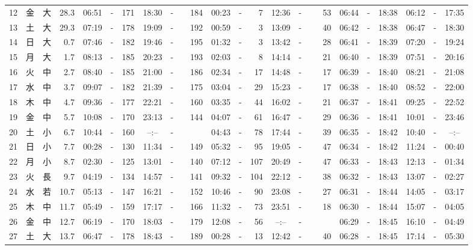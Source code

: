 \documentclass[12pt,a4j]{jsarticle}
\begin{document}
\begin{table}[htbp]
\begin{center}
{\begin{tabular}{|rc|cr|ccrccr|ccrccr|ccc|ccc|}
12 & 金 & 大 & 28.3 &  06:51 &-& 171 &  18:30 &-& 184 &  00:23 &-&   7 &  12:36 &-&  53 & 06:44 & -& 18:38 & 06:12 & -& 17:35 \\
13 & 土 & 大 & 29.3 &  07:19 &-& 178 &  19:09 &-& 192 &  00:59 &-&   3 &  13:09 &-&  40 & 06:42 & -& 18:38 & 06:47 & -& 18:30 \\
14 & 日 & 大 &  0.7 &  07:46 &-& 182 &  19:46 &-& 195 &  01:32 &-&   3 &  13:42 &-&  28 & 06:41 & -& 18:39 & 07:20 & -& 19:24 \\
15 & 月 & 大 &  1.7 &  08:13 &-& 185 &  20:23 &-& 193 &  02:03 &-&   8 &  14:14 &-&  21 & 06:40 & -& 18:39 & 07:51 & -& 20:16 \\
16 & 火 & 中 &  2.7 &  08:40 &-& 185 &  21:00 &-& 186 &  02:34 &-&  17 &  14:48 &-&  17 & 06:39 & -& 18:40 & 08:21 & -& 21:08 \\
17 & 水 & 中 &  3.7 &  09:07 &-& 182 &  21:39 &-& 175 &  03:04 &-&  29 &  15:23 &-&  17 & 06:38 & -& 18:40 & 08:52 & -& 22:00 \\
18 & 木 & 中 &  4.7 &  09:36 &-& 177 &  22:21 &-& 160 &  03:35 &-&  44 &  16:02 &-&  21 & 06:37 & -& 18:41 & 09:25 & -& 22:52 \\
19 & 金 & 中 &  5.7 &  10:08 &-& 170 &  23:13 &-& 144 &  04:07 &-&  61 &  16:47 &-&  29 & 06:36 & -& 18:41 & 10:01 & -& 23:46 \\
20 & 土 & 小 &  6.7 &  10:44 &-& 160 &  --:-- &-&~~~~~ &  04:43 &-&  78 &  17:44 &-&  39 & 06:35 & -& 18:42 & 10:40 & -& --:-- \\
21 & 日 & 小 &  7.7 &  00:28 &-& 130 &  11:34 &-& 149 &  05:32 &-&  95 &  19:05 &-&  47 & 06:34 & -& 18:42 & 11:24 & -& 00:40 \\
22 & 月 & 小 &  8.7 &  02:30 &-& 125 &  13:01 &-& 140 &  07:12 &-& 107 &  20:49 &-&  47 & 06:33 & -& 18:43 & 12:13 & -& 01:34 \\
23 & 火 & 長 &  9.7 &  04:19 &-& 134 &  14:57 &-& 141 &  09:32 &-& 104 &  22:12 &-&  38 & 06:32 & -& 18:43 & 13:07 & -& 02:27 \\
24 & 水 & 若 & 10.7 &  05:13 &-& 147 &  16:21 &-& 152 &  10:46 &-&  90 &  23:08 &-&  27 & 06:31 & -& 18:44 & 14:05 & -& 03:17 \\
25 & 木 & 中 & 11.7 &  05:49 &-& 159 &  17:17 &-& 166 &  11:32 &-&  73 &  23:51 &-&  18 & 06:30 & -& 18:44 & 15:07 & -& 04:05 \\
26 & 金 & 中 & 12.7 &  06:19 &-& 170 &  18:03 &-& 179 &  12:08 &-&  56 &  --:-- &-&~~~~~ & 06:29 & -& 18:45 & 16:10 & -& 04:49 \\
27 & 土 & 大 & 13.7 &  06:47 &-& 178 &  18:43 &-& 189 &  00:28 &-&  13 &  12:42 &-&  40 & 06:28 & -& 18:45 & 17:14 & -& 05:30 \\

\end{tabular}}
\end{center}
\end{table}
\end{document}
